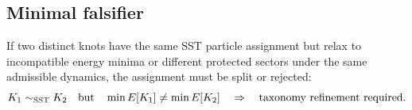 \subsection{Minimal falsifier}
If two distinct knots have the same SST particle assignment but relax to incompatible energy minima or different protected sectors under the same admissible dynamics, the assignment must be split or rejected:
\begin{equation}
    K_1\sim_{\rm SST}K_2
    \quad\text{but}\quad
    \min E[K_1]\neq \min E[K_2]
    \quad\Rightarrow\quad
    \text{taxonomy refinement required.}
\end{equation}


